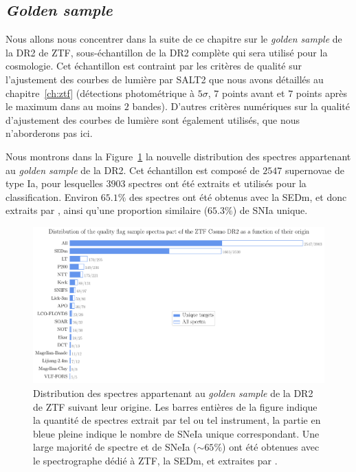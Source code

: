 \documentclass[../main/main.tex]{subfiles}
\begin{document}
\subsection{\textit{Golden sample}}

Nous allons nous concentrer dans la suite de ce chapitre sur le \textit{golden
  sample} de la DR2 de ZTF, sous-échantillon de la DR2 complète qui sera
utilisé pour la cosmologie. Cet échantillon est contraint par les
critères de qualité sur l'ajustement des courbes de lumière par SALT2
que nous avons détaillés au chapitre~\ref{ch:ztf} (détections
photométrique à $5\sigma$, $7$ points avant et $7$ points après le
maximum dans au moins $2$ bandes).
D'autres critères numériques sur la qualité d'ajustement des courbes de
lumière sont également
utilisés, que nous n'aborderons pas ici.

Nous montrons dans la Figure~\ref{fig:specorigingoldendr2} la nouvelle
distribution des spectres appartenant au \textit{golden sample} de la
DR2. Cet échantillon est composé de $2547$ supernovae de type Ia, pour lesquelles
$3903$ spectres ont été extraits et utilisés pour la classification.
Environ $65.1\%$ des spectres ont été obtenus avec la SEDm, et donc
extraits par \hypergal, ainsi qu'une proportion similaire ($65.3\%$) de SNIa
unique. 

\begin{figure}[ht]
  \centering
  \includegraphics[width=1\textwidth]{../figures/09_dr2/spec_instorigin_golden_dr2.pdf}
  \caption[Distribution des spectres appartenant au \textit{golden sample} de la DR2 de ZTF suivant
  leur origine]{Distribution des spectres appartenant au \textit{golden
      sample} de la DR2 de ZTF
    suivant 
    leur origine. Les barres entières de la figure indique la quantité de
    spectres extrait par tel ou tel instrument, la partie en bleue pleine
    indique le nombre de SNeIa unique correspondant. Une large majorité
    de spectre et de SNeIa ($\sim65\%$) ont été obtenues avec le spectrographe dédié à
    ZTF, la SEDm, et extraites par \hypergal.}
  \label{fig:specorigingoldendr2}
\end{figure}
\end{document}
